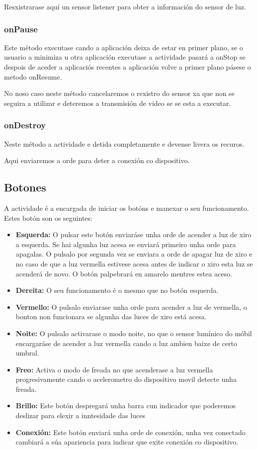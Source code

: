 Resxistrarase aquí un sensor listener para obter a información do sensor de luz.
\subsubsection{onPause}
Este método executase cando a aplicación deixa de estar en primer plano, se o usuario a minimiza u otra aplicación executase a actividade pasará a onStop se despois de aceder a aplicaciós recentes a aplicación volve a primer plano pásese o metodo onResume.

No noso caso neste método cancelaremos o rexistro do sensor xa que non se seguira a utilizar e deteremos a transmisión de video se se esta a executar.
\subsubsection{onDestroy}
Neste método a actividade e detida completamente e devense livera os recuros.

Aqui enviaremos a orde para deter a conexión co dispositivo.

\subsection{Botones}
A actividade é a encargada de iniciar os botóns e manexar o seu funcionamento. Estes botón son os seguintes:
\begin{itemize}
    \item \textbf{Esquerda:} O pulsar este botón enviaráse unha orde de acender a luz de xiro a esquerda. Se hai algunha luz acesa se enviará primeiro unha orde para apagalas. O pulsalo por segunda vez se enviara a orde de apagar luz de xiro e no caso de que a luz vermella estivese acesa antes de indicar o xiro esta luz se acenderá de novo. O botón palpebrará en amarelo mentres estea aceso.
    \item \textbf{Dereita:} O seu funcionamento é o mesmo que no botón esquerda.
    \item \textbf{Vermello:} O pulsalo enviarase unha orde para acender a luz de vermella, o bonton non funcionara se algunha das luces de xiro está acesa.
    \item \textbf{Noite:} O pulsalo activarase o modo noite, no que o sensor lumínico do móbil encargaráse de acender a luz vermella cando a luz ambien baixe de certo umbral.
    \item \textbf{Freo:} Activa o modo de freada no que acenderase a luz vermella progresivamente cando o acelerometro do dispositivo movil detecte unha freada.
    \item \textbf{Brillo:} Este botón despregará unha barra cun indicador que poderemos deslizar para elexir a inntesidade das luces
    \item \textbf{Conexión:} Este botón enviará unha orde de conexión, unha vez conectado cambiará a súa apariencia para indicar que exite conexión co dispositivo.
\end{itemize}
